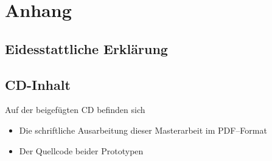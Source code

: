 \documentclass[
	a4paper,
	oneside,
	11pt,
	headsepline, %
]{scrreprt} %
\begin{document}
\nocite{*}
\pagestyle{empty}



\renewcommand{\contentsname}{Inhalt}
\tableofcontents
\cleardoublepage
\pagestyle{headings}
%









%
%

\printglossary[type=\acronymtype, title=Abkürzungen, style=super]
\printglossary[type=main,style=altlist]
%
%
\clearpage
{}
\listoffigures
%
%
\renewcommand\lstlistlistingname{Quellcodeverzeichnis}
\lstlistoflistings
%
%


%
%
\clearpage
\appendix
{}
\chapter*{Anhang}
\section*{Eidesstattliche Erklärung}
\section*{CD-Inhalt}
Auf der beigefügten CD befinden sich
\begin{itemize}
	\item Die schriftliche Ausarbeitung dieser Masterarbeit im PDF--Format
	\item Der Quellcode beider Prototypen
\end{itemize}
%
\end{document}
